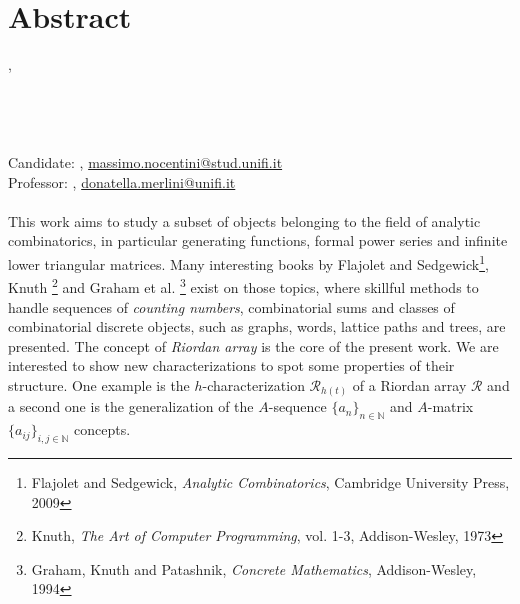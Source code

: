 \begingroup
\let\clearpage\relax
\let\cleardoublepage\relax
\let\cleardoublepage\relax

\chapter*{Abstract}

\iftrue 
{\small
\begingroup
    {\footnotesize 
        \myUni,
        \emph{\myDegree}}\\\\
    {\color{Maroon}\spacedallcaps{\myTitle}} \\ 
    {\color{Maroon}\spacedallcaps{\myEnglishTitle}} \\\\ 
    Candidate: \emph{\myName}, \url{massimo.nocentini@stud.unifi.it} \\ 
    Professor: \emph{\myProf}, \url{donatella.merlini@unifi.it}\\
\endgroup
\\
This work aims to study a subset of objects belonging to the field of analytic combinatorics,
in particular generating functions, formal power series
and infinite lower triangular matrices. Many interesting
books by Flajolet and Sedgewick\footnote{Flajolet and Sedgewick,
\emph{Analytic Combinatorics}, Cambridge University Press, 2009}, Knuth
\footnote{Knuth, \emph{The Art of Computer Programming}, vol.  1-3, Addison-Wesley,
1973} and Graham et al. \footnote{Graham, Knuth and Patashnik, \emph{Concrete
Mathematics}, Addison-Wesley, 1994} exist on those topics, where skillful
methods to handle sequences of \emph{counting numbers}, combinatorial sums and
classes of combinatorial discrete objects, such as graphs, words, lattice paths
and trees, are presented. The concept of \emph{Riordan array} is
the core of the present work.  We are interested to show new characterizations
to spot some properties of their structure. One example is the
$h$-characterization $\mathcal{R}_{h(t)}$ of a Riordan array $\mathcal{R}$ and
a second one is the generalization of the $A$-sequence $\lbrace
a_{n}\rbrace_{n\in\mathbb{N}}$ and $A$-matrix $\lbrace
a_{ij}\rbrace_{i,j\in\mathbb{N}}$ concepts.

}
